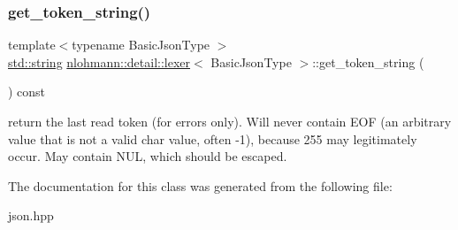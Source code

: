 \subsubsection{\texorpdfstring{get\+\_\+token\+\_\+string()}{get\_token\_string()}}
{\footnotesize\ttfamily template$<$typename Basic\+Json\+Type $>$ \\
\hyperlink{namespacenlohmann_1_1detail_a90aa5ef615aa8305e9ea20d8a947980fab45cffe084dd3d20d928bee85e7b0f21}{std\+::string} \hyperlink{classnlohmann_1_1detail_1_1lexer}{nlohmann\+::detail\+::lexer}$<$ Basic\+Json\+Type $>$\+::get\+\_\+token\+\_\+string (\begin{DoxyParamCaption}{ }\end{DoxyParamCaption}) const\hspace{0.3cm}{\ttfamily [inline]}}

return the last read token (for errors only). Will never contain E\+OF (an arbitrary value that is not a valid char value, often -\/1), because 255 may legitimately occur. May contain N\+UL, which should be escaped. 

The documentation for this class was generated from the following file\+:\begin{DoxyCompactItemize}
\item 
json.\+hpp\end{DoxyCompactItemize}
